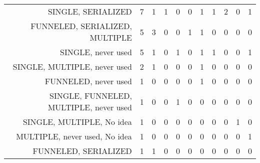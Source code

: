 {\begin{landscape}
\begin{longtable}[htb]{r|c|c|c|c|c|c|c|c|c|c}
{SINGLE, SERIALIZED} & 7 & 1 & 1 & 0 & 0 & 1 & 1 & 2 & 0 & 1 \\%
{FUNNELED, SERIALIZED, MULTIPLE} & 5 & 3 & 0 & 0 & 1 & 1 & 0 & 0 & 0 & 0 \\%
{SINGLE, never used} & 5 & 1 & 0 & 1 & 0 & 1 & 1 & 0 & 0 & 1 \\%
{SINGLE, MULTIPLE, never used} & 2 & 1 & 0 & 0 & 0 & 1 & 0 & 0 & 0 & 0 \\%
{FUNNELED, never used} & 1 & 0 & 0 & 0 & 0 & 1 & 0 & 0 & 0 & 0 \\%
{SINGLE, FUNNELED, MULTIPLE, never used} & 1 & 0 & 0 & 1 & 0 & 0 & 0 & 0 & 0 & 0 \\%
{SINGLE, MULTIPLE, No idea} & 1 & 0 & 0 & 0 & 0 & 0 & 0 & 0 & 1 & 0 \\%
{MULTIPLE, never used, No idea} & 1 & 0 & 0 & 0 & 0 & 0 & 0 & 0 & 0 & 1 \\%
{FUNNELED, SERIALIZED} & 1 & 1 & 0 & 0 & 0 & 0 & 0 & 0 & 0 & 0 \\%
\hline%
\end{longtable}%
\end{landscape}}%
\clearpage%
